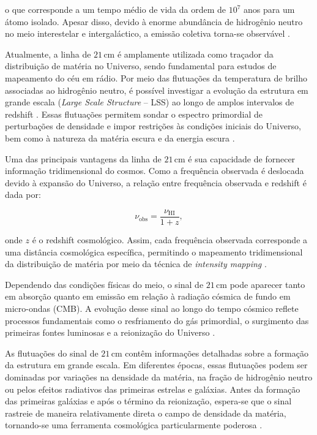 o que corresponde a um tempo médio de vida da ordem de \(10^7\) anos para um átomo isolado. Apesar disso, devido à enorme abundância de hidrogênio neutro no meio interestelar e intergaláctico, a emissão coletiva torna-se observável \cite{ufrgs_21cm_line, hossain2018salsa}.

Atualmente, a linha de \(21\,\mathrm{cm}\) é amplamente utilizada como traçador da distribuição de matéria no Universo, sendo fundamental para estudos de mapeamento do céu em rádio. Por meio das flutuações da temperatura de brilho associadas ao hidrogênio neutro, é possível investigar a evolução da estrutura em grande escala (\textit{Large Scale Structure} – LSS) ao longo de amplos intervalos de redshift \cite{harper2018potential}. Essas flutuações permitem sondar o espectro primordial de perturbações de densidade e impor restrições às condições iniciais do Universo, bem como à natureza da matéria escura e da energia escura \cite{loeb2008possibility21}.

Uma das principais vantagens da linha de \(21\,\mathrm{cm}\) é sua capacidade de fornecer informação tridimensional do cosmos. Como a frequência observada é deslocada devido à expansão do Universo, a relação entre frequência observada e redshift é dada por:

\begin{equation}
\nu_{\mathrm{obs}} = \frac{\nu_{\mathrm{HI}}}{1+z},
\end{equation}

onde \(z\) é o redshift cosmológico. Assim, cada frequência observada corresponde a uma distância cosmológica específica, permitindo o mapeamento tridimensional da distribuição de matéria por meio da técnica de \textit{intensity mapping} \cite{pritchard2008evolution21,loeb2008possibility21}.

Dependendo das condições físicas do meio, o sinal de \(21\,\mathrm{cm}\) pode aparecer tanto em absorção quanto em emissão em relação à radiação cósmica de fundo em micro-ondas (CMB). A evolução desse sinal ao longo do tempo cósmico reflete processos fundamentais como o resfriamento do gás primordial, o surgimento das primeiras fontes luminosas e a reionização do Universo \cite{pritchard2008evolution21}.

As flutuações do sinal de \(21\,\mathrm{cm}\) contêm informações detalhadas sobre a formação da estrutura em grande escala. Em diferentes épocas, essas flutuações podem ser dominadas por variações na densidade da matéria, na fração de hidrogênio neutro ou pelos efeitos radiativos das primeiras estrelas e galáxias. Antes da formação das primeiras galáxias e após o término da reionização, espera-se que o sinal rastreie de maneira relativamente direta o campo de densidade da matéria, tornando-se uma ferramenta cosmológica particularmente poderosa \cite{pritchard2008evolution21}.

